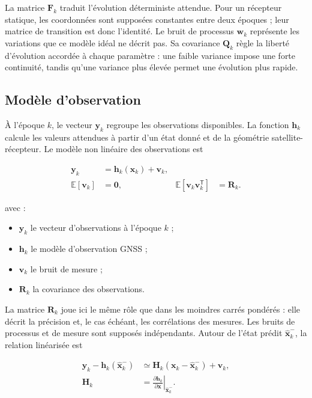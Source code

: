 La matrice $\mathbf F_k$ traduit l'évolution déterministe attendue. Pour un
récepteur statique, les coordonnées sont supposées constantes entre deux
époques ; leur matrice de transition est donc l'identité. Le bruit de processus
$\mathbf w_k$ représente les variations que ce modèle idéal ne décrit pas. Sa
covariance $\mathbf Q_k$ règle la liberté d'évolution accordée à chaque
paramètre : une faible variance impose une forte continuité, tandis qu'une
variance plus élevée permet une évolution plus rapide.

\subsection{Modèle d'observation}

À l'époque $k$, le vecteur $\mathbf y_k$ regroupe les observations disponibles.
La fonction $\mathbf h_k$ calcule les valeurs attendues à partir d'un état
donné et de la géométrie satellite-récepteur. Le modèle non linéaire des
observations est

\begin{align}
\mathbf y_k
&=
\mathbf h_k(\mathbf x_k)+\mathbf v_k,
\\
\mathbb E[\mathbf v_k]
&=\mathbf0,
&
\mathbb E[\mathbf v_k\mathbf v_k^{\mathsf T}]
&=\mathbf R_k.
\label{ann:eq:kalman_observation}
\end{align}

avec :

\begin{itemize}
    \item $\mathbf y_k$ le vecteur d'observations à l'époque $k$ ;
    \item $\mathbf h_k$ le modèle d'observation GNSS ;
    \item $\mathbf v_k$ le bruit de mesure ;
    \item $\mathbf R_k$ la covariance des observations.
\end{itemize}

La matrice $\mathbf R_k$ joue ici le même rôle que dans les moindres carrés
pondérés : elle décrit la précision et, le cas échéant, les corrélations des
mesures. Les bruits de processus et de mesure sont supposés indépendants.
Autour de l'état prédit $\widehat{\mathbf x}_k^-$, la relation linéarisée est

\begin{align}
\mathbf y_k-\mathbf h_k(\widehat{\mathbf x}_k^-)
&\simeq
\mathbf H_k
\left(\mathbf x_k-\widehat{\mathbf x}_k^-\right)
+\mathbf v_k,
\\
\mathbf H_k
&=
\left.
\frac{\partial\mathbf h_k}{\partial\mathbf x}
\right|_{\widehat{\mathbf x}_k^-}.
\label{ann:eq:ekf_linearization}
\end{align}

